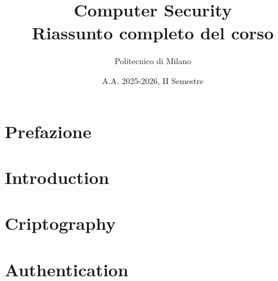 \documentclass[11pt,a4paper]{article}
\title{\textbf{Computer Security}\\
\large Riassunto completo del corso}
\author{Politecnico di Milano}
\date{A.A. 2025-2026, II Semestre}
\newcommand{\folder}{Chapters/} %
\begin{document}
\maketitle
\tableofcontents
\newpage

\section{Prefazione}


\section{Introduction}


\section{Criptography}


\section{Authentication}

\end{document}
